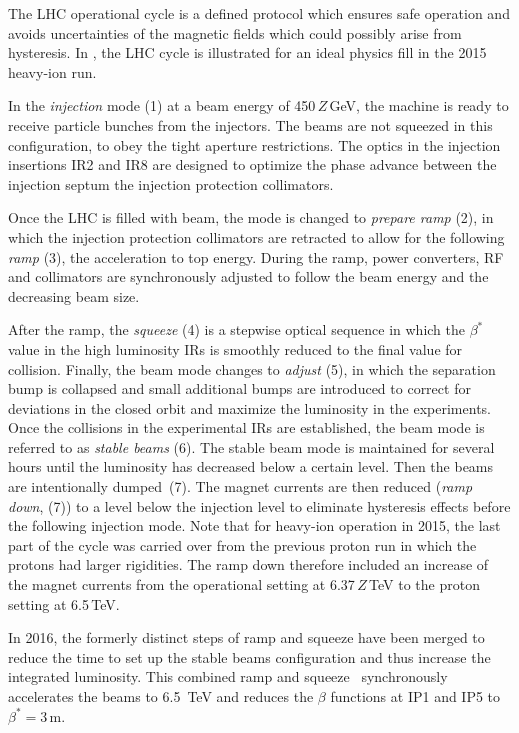 The LHC operational cycle is a defined protocol which ensures safe operation and avoids uncertainties of the magnetic fields which could possibly arise from hysteresis.  In , the LHC cycle is illustrated for an ideal \lead physics fill in the 2015 heavy-ion run. 

In the \textit{injection} mode (1) at a beam energy of 450$\,Z\,$GeV, the machine is ready to receive particle bunches from the injectors. The beams are not squeezed in this configuration, to obey the tight aperture restrictions. The optics in the injection insertions IR2 and IR8 are designed to optimize the phase advance between the injection septum the injection protection collimators. 

Once the LHC is filled with beam, the mode is changed to \textit{prepare ramp} (2), in which the injection protection collimators are retracted to allow for the following \textit{ramp} (3), the acceleration to top energy. During the ramp, power converters, RF and collimators are synchronously adjusted to follow the beam energy and the decreasing beam size.

After the ramp, the \textit{squeeze} (4) is a stepwise optical sequence in which the $\beta^*$ value in the high luminosity IRs is smoothly reduced to the final value for collision. Finally, the beam mode changes to \textit{adjust} (5), in which the separation bump is collapsed and small additional bumps are introduced to correct for deviations in the closed orbit and maximize the luminosity in the experiments. Once the collisions in the experimental IRs are established, the beam mode is referred to as \textit{stable beams} (6). 
The stable beam mode is maintained for several hours until the luminosity has decreased below a certain level. Then the beams are intentionally \mbox{dumped (7)}. The magnet currents are then reduced (\textit{ramp down}, (7)) to a level below the injection level to eliminate hysteresis effects before the following injection mode. Note that for heavy-ion operation in 2015, the last part of the cycle was carried over from the previous proton run in which the protons had larger rigidities. The ramp down therefore included an increase of the magnet currents from the operational setting at 6.37$\,Z\,$TeV to the proton setting at 6.5$\,$TeV.

In 2016, the formerly distinct steps of ramp and squeeze have been merged to reduce the time to set up the stable beams configuration and thus increase the integrated luminosity. This combined ramp and squeeze~\cite{IPAC12:MOPPC016} synchronously accelerates the beams to 6.5~TeV and reduces the $\beta$ functions at IP1 and IP5 to $\beta^*=3\,$m.



